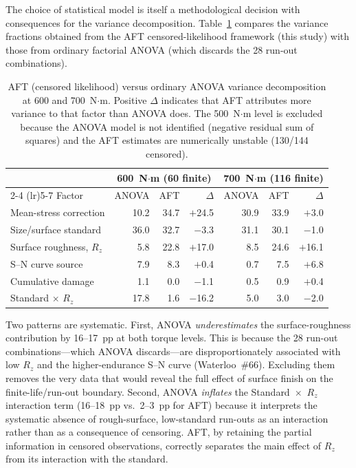 \documentclass[12pt,a4paper]{article}
\begin{document}
The choice of statistical model is itself a methodological decision
with consequences for the variance decomposition. Table~\ref{tab:aft_vs_anova}
compares the variance fractions obtained from the AFT censored-likelihood
framework (this study) with those from ordinary factorial ANOVA (which
discards the 28 run-out combinations).

\begin{table}[h]
\centering
\caption{AFT (censored likelihood) versus ordinary ANOVA variance
decomposition at 600 and 700~N$\cdot$m. Positive $\Delta$ indicates
that AFT attributes more variance to that factor than ANOVA does.
The 500~N$\cdot$m level is excluded because the ANOVA model is
not identified (negative residual sum of squares) and the AFT
estimates are numerically unstable (130/144 censored).\label{tab:aft_vs_anova}}
\begin{tabular}{lrrrrrr}
\toprule
& \multicolumn{3}{c}{600~N$\cdot$m (60 finite)} & \multicolumn{3}{c}{700~N$\cdot$m (116 finite)} \\
\cmidrule(lr){2-4} \cmidrule(lr){5-7}
Factor & ANOVA & AFT & $\Delta$ & ANOVA & AFT & $\Delta$ \\
\midrule
Mean-stress correction & 10.2 & 34.7 & $+$24.5 & 30.9 & 33.9 & $+$3.0 \\
Size/surface standard & 36.0 & 32.7 & $-$3.3 & 31.1 & 30.1 & $-$1.0 \\
Surface roughness, $R_z$ & 5.8 & 22.8 & $+$17.0 & 8.5 & 24.6 & $+$16.1 \\
S--N curve source & 7.9 & 8.3 & $+$0.4 & 0.7 & 7.5 & $+$6.8 \\
Cumulative damage & 1.1 & 0.0 & $-$1.1 & 0.5 & 0.9 & $+$0.4 \\
Standard $\times$ $R_z$ & 17.8 & 1.6 & $-$16.2 & 5.0 & 3.0 & $-$2.0 \\
\bottomrule
\end{tabular}
\end{table}

Two patterns are systematic. First, ANOVA \emph{underestimates} the
surface-roughness contribution by 16--17~pp at both torque levels.
This is because the 28 run-out combinations---which ANOVA discards---are
disproportionately associated with low $R_z$ and the higher-endurance
S--N curve (Waterloo~\#66). Excluding them removes the very data that
would reveal the full effect of surface finish on the
finite-life/run-out boundary. Second, ANOVA \emph{inflates} the
Standard~$\times$~$R_z$ interaction term (16--18~pp vs.\ 2--3~pp for
AFT) because it interprets the systematic absence of rough-surface,
low-standard run-outs as an interaction rather than as a consequence of
censoring. AFT, by retaining the partial information in censored
observations, correctly separates the main effect of $R_z$ from its
interaction with the standard.
\end{document}
